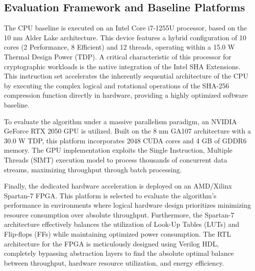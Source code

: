 \documentclass[conference]{IEEEtran}
\begin{document}
\subsection{Evaluation Framework and Baseline Platforms}
The CPU baseline is executed on an Intel Core i7-1255U processor, based on the 10 nm Alder Lake architecture. This device features a hybrid configuration of 10 cores (2 Performance, 8 Efficient) and 12 threads, operating within a 15.0 W Thermal Design Power (TDP). A critical characteristic of this processor for cryptographic workloads is the native integration of the Intel SHA Extensions. This instruction set accelerates the inherently sequential architecture of the CPU by executing the complex logical and rotational operations of the SHA-256 compression function directly in hardware, providing a highly optimized software baseline.

To evaluate the algorithm under a massive parallelism paradigm, an NVIDIA GeForce RTX 2050 GPU is utilized. Built on the 8 nm GA107 architecture with a 30.0 W TDP, this platform incorporates 2048 CUDA cores and 4 GB of GDDR6 memory. The GPU implementation exploits the Single Instruction, Multiple Threads (SIMT) execution model to process thousands of concurrent data streams, maximizing throughput through batch processing.

Finally, the dedicated hardware acceleration is deployed on an AMD/Xilinx Spartan-7 FPGA. This platform is selected to evaluate the algorithm's performance in environments where logical hardware design prioritizes minimizing resource consumption over absolute throughput. Furthermore, the Spartan-7 architecture effectively balances the utilization of Look-Up Tables (LUTs) and Flip-flops (FFs) while maintaining optimized power consumption. The RTL architecture for the FPGA is meticulously designed using Verilog HDL, completely bypassing abstraction layers to find the absolute optimal balance between throughput, hardware resource utilization, and energy efficiency.
\end{document}
